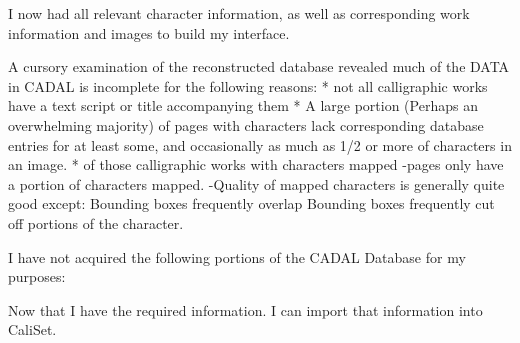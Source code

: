                 
                I now had all relevant character information, as well as corresponding work information and images to build my interface.
                
    A cursory examination of the reconstructed database revealed much of the DATA in CADAL is incomplete for the following reasons:
        * not all calligraphic works have a text script or title accompanying them
        * A large portion (Perhaps an overwhelming majority) of pages with characters lack corresponding database entries for at least some, and occasionally as much as 1/2 or more of characters in an image.
        * of those calligraphic works with characters mapped
            -pages only have a portion of characters mapped.
            -Quality of mapped characters is generally quite good except:
                Bounding boxes frequently overlap
                Bounding boxes frequently cut off portions of the character.                
    
    
    I have not acquired the following portions of the CADAL Database for my purposes:
    
    
    
    Now that I have the required information.  I can import that information into CaliSet.

